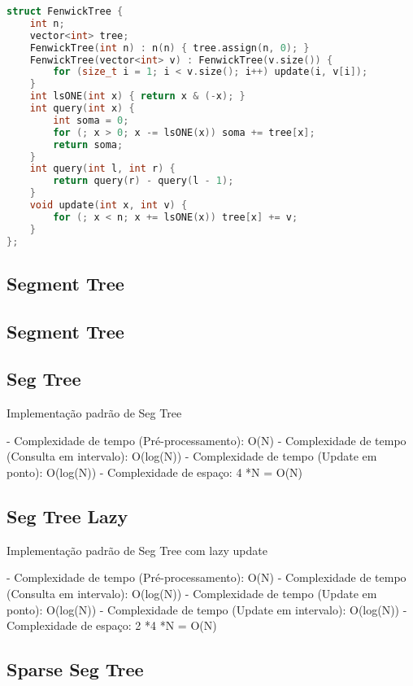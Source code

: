 \documentclass[11pt, a4paper, twoside]{article}
\begin{document}
\begin{lstlisting}[language=C++]
struct FenwickTree {
    int n;
    vector<int> tree;
    FenwickTree(int n) : n(n) { tree.assign(n, 0); }
    FenwickTree(vector<int> v) : FenwickTree(v.size()) {
        for (size_t i = 1; i < v.size(); i++) update(i, v[i]);
    }
    int lsONE(int x) { return x & (-x); }
    int query(int x) {
        int soma = 0;
        for (; x > 0; x -= lsONE(x)) soma += tree[x];
        return soma;
    }
    int query(int l, int r) {
        return query(r) - query(l - 1);
    }
    void update(int x, int v) {
        for (; x < n; x += lsONE(x)) tree[x] += v;
    }
};
\end{lstlisting}

\subsection{Segment Tree}

\subsection{Segment Tree}



\subsection{Seg Tree}

Implementação padrão de Seg Tree

- Complexidade de tempo (Pré-processamento): O(N)
- Complexidade de tempo (Consulta em intervalo): O(log(N))
- Complexidade de tempo (Update em ponto): O(log(N))
- Complexidade de espaço: 4 *N = O(N)

\subsection{Seg Tree Lazy}

Implementação padrão de Seg Tree com lazy update

- Complexidade de tempo (Pré-processamento): O(N)
- Complexidade de tempo (Consulta em intervalo): O(log(N))
- Complexidade de tempo (Update em ponto): O(log(N))
- Complexidade de tempo (Update em intervalo): O(log(N))
- Complexidade de espaço: 2 *4 *N = O(N)

\subsection{Sparse Seg Tree}
\end{document}
